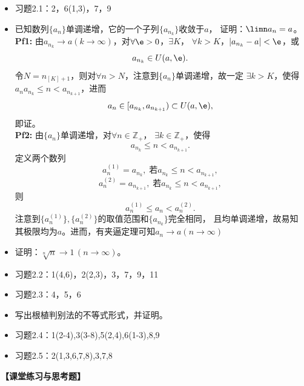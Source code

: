 \begin{itemize}
  \item 习题2.1：2，6(1,3)，7，9
  \item 已知数列$\{a_n\}$单调递增，它的一个子列$\{a_{n_k}\}$收敛于$a$，
  证明：$\limn a_n=a$。\\
  {\bf Pf1:} 由$a_{n_k}\to a(k\to\infty)$，对$\forall\e>0$，$\exists K$，
  $\forall k>K$，$|a_{n_k}-a|<\e$，或
  $$a_{n_k}\in U(a,\e).$$
  令$N=n_{[K]+1}$，则对$\forall n>N$，注意到$\{a_n\}$单调递增，故一定
  $\exists k>K$，使得$a_na_{n_k}\leq n<a_{n_{k+1}}$，进而
  $$a_n\in[a_{n_k},a_{n_{k+1}})\subset U(a,\e),$$
  即证。\\
  {\bf Pf2:} 由$\{a_n\}$单调递增，对$\forall n\in\mathbb{Z}_+$，
  $\exists k\in\mathbb{Z}_+$，使得
  $$a_{n_k}\leq n<a_{n_{k+1}}.$$
  定义两个数列
  $$a_n^{(1)}=a_{n_k},\;\mbox{若}a_{n_k}\leq n<a_{n_{k+1}},$$
  $$a_n^{(2)}=a_{n_{k+1}},\;\mbox{若}a_{n_k}\leq n<a_{n_{k+1}},$$
  则
  $$a_n^{(1)}\leq a_n<a_n^{(2)}.$$
  注意到$\{a_n^{(1)}\},\{a_n^{(2)}\}$的取值范围和$\{a_{n_k}\}$完全相同，
  且均单调递增，故易知其极限均为$a$。进而，有夹逼定理可知$a_n\to a(n\to\infty)$
  \item 证明：$\sqrt[n]n\to 1\,(n\to\infty)$。
  \item 习题2.2：1(4,6)，2(2,3)，3，7，9，11
  \item 习题2.3：4，5，6
  \item 写出根植判别法的不等式形式，并证明。
  \item 习题2.4：1(2-4),3(3-8),5(2,4),6(1-3),8,9
  \item 习题2.5：2(1,3,6,7,8),3,7,8
\end{itemize}

{\bf 【课堂练习与思考题】}

